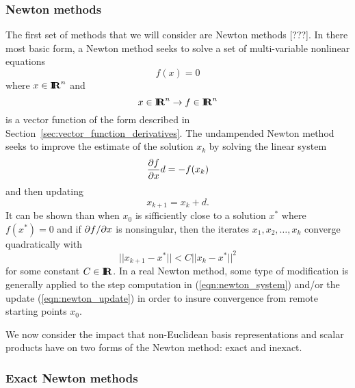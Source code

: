 \subsubsection{Newton methods}

The first set of methods that we will consider are Newton methods [???].  In
there most basic form, a Newton method seeks to solve a set of multi-variable
nonlinear equations
%
\[
f(x) = 0
\]
%
where $x\in\mbox{\textbf{I}}\hspace{-0.6ex}\mbox{\textbf{R}}^n$ and
%
\[
x\in\mbox{\textbf{I}}\hspace{-0.6ex}\mbox{\textbf{R}}^n \rightarrow f\in\mbox{\textbf{I}}\hspace{-0.6ex}\mbox{\textbf{R}}^n
\]
%
is a vector function of the form described in
Section~\ref{sec:vector_function_derivatives}.  The undampended Newton method
seeks to improve the estimate of the solution $x_k$ by solving the linear
system
%
\begin{equation}
\displaystyle{\frac{\partial f}{\partial x}} d = - f(x_k)
\label{eqn:newton_system}
\end{equation}
%
and then updating
%
\begin{equation}
x_{k+1} = x_k + d.
\label{eqn:newton_update}
\end{equation}
%
It can be shown than when $x_0$ is sifficiently close to a solution $x^*$
where $f(x^*)=0$ and if $\partial f / \partial x$ is nonsingular, then the iterates $x_1,
x_2, {}\ldots, x_k$ converge quadratically with
%
\[
||x_{k+1}-x^*|| < C ||x_k-x^*||^2
\]
for some constant $C\in\mbox{\textbf{I}}\hspace{-0.6ex}\mbox{\textbf{R}}$.  In a real Newton method, some type of
modification is generally applied to the step computation in
(\ref{eqn:newton_system}) and/or the update (\ref{eqn:newton_update}) in order
to insure convergence from remote starting points $x_0$.

We now consider the impact that non-Euclidean basis representations and scalar
products have on two forms of the Newton method: exact and inexact.

\subsubsection*{Exact Newton methods}

